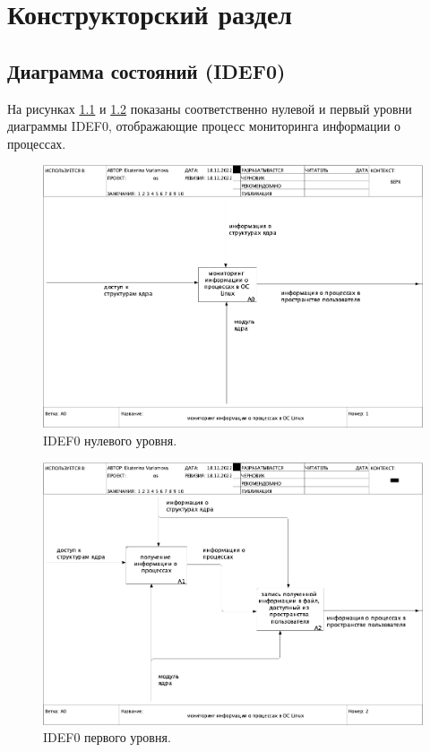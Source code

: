 \chapter{Конструкторский раздел}

\section{Диаграмма состояний (IDEF0)}
На рисунках \ref{fig:idef01} и \ref{fig:idef02} показаны соответственно нулевой и первый уровни диаграммы IDEF0, отображающие процесс мониторинга информации о процессах.

\begin{figure}[H]
	\centering
	\includegraphics[scale=0.32]{img/01_A0.png}
	\caption{IDEF0 нулевого уровня.}
	\label{fig:idef01}
\end{figure}

\begin{figure}[H]
	\centering
	\includegraphics[scale=0.32]{img/02_A0.png}
	\caption{IDEF0 первого уровня.}
	\label{fig:idef02}
\end{figure}
\newpage
